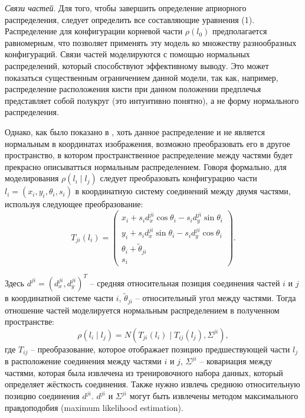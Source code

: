 \emph{Связи частей}. Для того, чтобы завершить определение априорного распределения, следует определить все составляющие уравнения (1). Распределение для конфигурации корневой части \(\rho(l_0)\) предполагается равномерным, что позволяет применять эту модель ко множеству разнообразных конфигураций. Связи частей моделируются с помощью нормальных распределений, который способствуют эффективному выводу. Это может показаться существенным ограничением данной модели, так как, например, распределение расположения кисти при данном положении предплечья представляет собой полукруг (это интуитивно понятно), а не форму нормального распределения.

Однако, как было показано в \cite{felzenszwalb05}, хоть данное распределение и не является нормальным в координатах изображения, возможно преобразовать его в другое пространство, в котором пространственное распределение между частями будет прекрасно описыватться нормальным распределением. Говоря формально, для моделирования \(\rho(l_i{\mid}l_j)\) следует преобразовать конфигурацию части \(l_i = (x_i, y_i, \theta_i, s_i)\) в координатную систему соединений между двумя частями, используя следующее преобразование:
\begin{equation}
  T_{ji}(l_i) =
  \begin{pmatrix}
    x_i + s_id_x^{ji}\cos{\theta_i} - s_id_y^{ji}\sin{\theta_i}\\
    y_i + s_id_x^{ji}\sin{\theta_i} - s_id_y^{ji}\cos{\theta_i}\\
    \theta_i + \tilde{\theta}_{ji}\\
    s_i
  \end{pmatrix}.
\end{equation}

Здесь \(d^{ji} = (d_x^{ji}, d_y^{ji})^T\) -- средняя относительная позиция соединения частей \(i\) и \(j\) в координатной системе части \(i\), \(\tilde{\theta}_{ji}\) -- относительный угол между частями. Тогда отношение частей моделируется нормальным распределением в полученном пространстве:
\begin{equation}
  \rho(l_i{\mid}l_j) = N(T_{ji}(l_i){\mid}T_{ij}(l_j), \Sigma^{ji}),
\end{equation}
где \(T_{ij}\) -- преобразование, которое отображает позицию предшествующей части \(l_j\) в расположение соединения между частями \(i\) и \(j\), \(\Sigma^{ji}\) -- ковариация между частями, которая была извлечена из тренировочного набора данных, который определяет жёсткость соединения. Также нужно извлечь среднюю относительную позицию соединения \(d^{ji}\). \(d^{ji}\) и \(\Sigma^{ji}\) могут быть извлечены методом максимального правдоподобия (maximum likelihood estimation).

